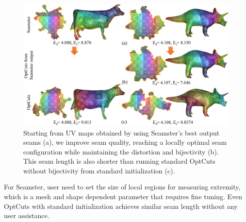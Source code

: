 \begin{figure}[!h]
\centering
\includegraphics[width=\linewidth]{fig/comp_Seamster.png}
\caption{ Starting from UV maps obtained by using Seamster's best output seams (a), we improve seam quality, reaching a locally optimal seam configuration while maintaining the distortion and bijectivity (b). This seam length is also shorter than running standard OptCuts without bijectivity from standard initialization (c).}
\label{fig:comp_Seamster}
\end{figure}

For Seamster, user need to set the size of local regions for measuring extremity, which is a mesh and shape dependent parameter that requires fine tuning. Even OptCuts with standard initialization achieves similar seam length without any user assistance.
